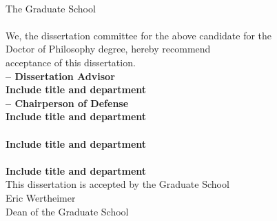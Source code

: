 \documentclass[
12pt, %
oneside, %
english, %
doublespacing, %
liststotoc, %
]{main} %
\begin{document}
\begin{singlespace}

\setcounter{page}{2}
\begin{center}
	\textbf{\univname}\\[0.5cm]
	The Graduate School\\[2cm]
	\textbf{\authorname}\\[2cm]
	We, the dissertation committee for the above candidate for the \\[0.5cm]
	Doctor of Philosophy degree, hereby recommend \\[0.5cm]
	acceptance of this dissertation. \\[1cm]
	
	\textbf{{\supname} -- Dissertation Advisor\\
	Include title and department}\\ [1cm]
	
	\textbf{{\examinerOname} -- Chairperson of Defense\\
	Include title and department}\\ [1cm]
	
	\textbf{{\examinerThname}\\
	Include title and department}\\ [1cm]
	
	\textbf{{\examinerJrname}\\
	Include title and department}\\ [1cm]
	
	This dissertation is accepted by the Graduate School\\ [2cm]
	Eric Wertheimer\\ [0.5cm]
	Dean of the Graduate School\\ [0.5cm]
	
%
%
\end{center}




\end{singlespace}
\end{document}
